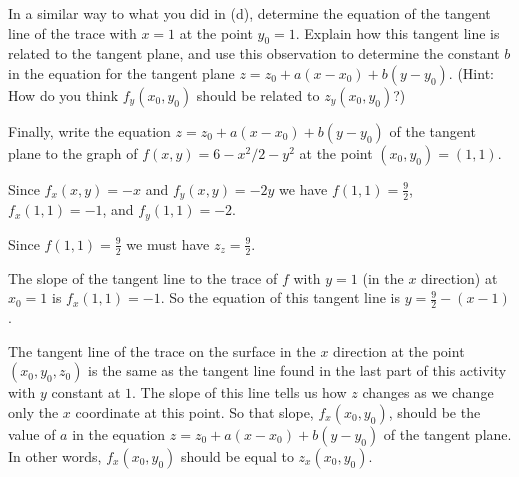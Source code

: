\begin{pa}
\item In a similar way to what you did in (d), determine the equation of the tangent line of the
  trace with $x=1$ at the point $y_0=1$.  Explain how this tangent
  line is related to the tangent plane, and use this observation to
  determine the constant $b$ in the equation for the tangent plane
  $z=z_0+a(x-x_0) + b(y-y_0)$. (Hint: How do you think $f_y(x_0,y_0)$ should be related to $z_y(x_0,y_0)$?)

\item Finally, write the equation $z=z_0 + a(x-x_0) + b(y-y_0)$ of the tangent
  plane to the graph of $f(x,y)=6-x^2/2 - y^2$ at the point
  $(x_0,y_0)=(1,1)$. 

\ea

\end{pa}

\begin{activitySolution} 
\ba
\item Since $f_x(x,y) = -x$ and $f_y(x,y) = -2y$ we have $f(1,1) = \frac{9}{2}$, $f_x(1,1) = -1$, and $f_y(1,1) = -2$. 

\item Since $f(1,1) = \frac{9}{2}$ we must have $z_z=\frac{9}{2}$. 

\item 


\item The slope of the tangent line to the trace of $f$ with $y=1$ (in the $x$ direction) at $x_0=1$ is $f_x(1,1) = -1$. So the equation of this tangent line is $y = \frac{9}{2} - (x-1)$. 


  
\item The tangent line of the trace on the surface in the $x$ direction at the point $(x_0,y_0,z_0)$ is the same as the tangent line found in the 
  last part of this activity with $y$ constant at $1$. The slope of this line tells us how $z$ changes as we change only the $x$ coordinate at this point. So that slope, $f_x(x_0,y_0)$, should be the value of $a$  in the equation $z = z_0+a(x-x_0) + b(y-y_0)$ of the tangent plane. In other words, $f_x(x_0,y_0)$ should be equal to $z_x(x_0,y_0)$. 



\end{activitySolution}
